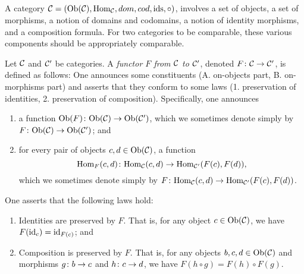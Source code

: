 \documentclass[CT4S-EN-RU]{subfiles}
\begin{document}
\begin{remarkRUS}
\end{remarkRUS}


\subsection{}

\begin{blockENG}
A category $\mathcal{C}=(\textnormal{Ob}(\mathcal{C}),\textnormal{Hom}_\mathcal{C},dom,cod,\textnormal{ids},\circ)$, involves a set of objects, a set of morphisms, a notion of domains and codomains, a notion of identity morphisms, and a composition formula. For two categories to be comparable, these various components should be appropriately comparable.
\end{blockENG}

\begin{blockRUS}
\end{blockRUS}

\begin{definitionENG}\label{def:functor}
Let $\mathcal{C}$ and $\mathcal{C}'$ be categories. A {\em functor $F$ from $\mathcal{C}$ to $\mathcal{C}'$}, denoted $F\colon\mathcal{C}\rightarrow\mathcal{C}'$, is defined as follows: One announces some constituents (A. on-objects part, B. on-morphisms part) and asserts that they conform to some laws (1. preservation of identities, 2. preservation of composition). Specifically, one announces
\begin{enumerate}[\hsp A.]
\item a function $\textnormal{Ob}(F)\colon\textnormal{Ob}(\mathcal{C})\rightarrow\textnormal{Ob}(\mathcal{C}')$, which we sometimes denote simply by $F\colon\textnormal{Ob}(\mathcal{C})\rightarrow\textnormal{Ob}(\mathcal{C}')$; and
\item for every pair of objects $c,d\in\textnormal{Ob}(\mathcal{C})$, a function $$\textnormal{Hom}_F(c,d)\colon\textnormal{Hom}_\mathcal{C}(c,d)\rightarrow\textnormal{Hom}_{\mathcal{C}'}(F(c),F(d)),$$ which we sometimes denote simply by $F\colon\textnormal{Hom}_\mathcal{C}(c,d)\rightarrow\textnormal{Hom}_{\mathcal{C}'}(F(c),F(d))$.
\end{enumerate}
One asserts that the following laws hold:
\begin{enumerate}[\hsp 1.]
\item Identities are preserved by $F$. That is, for any object $c\in\textnormal{Ob}(\mathcal{C})$, we have $F(\textnormal{id}_c)=\textnormal{id}_{F(c)}$; and
\item Composition is preserved by $F$. That is, for any objects $b,c,d\in\textnormal{Ob}(\mathcal{C})$ and morphisms $g\colon b\rightarrow c$ and $h\colon c\rightarrow d$, we have $F(h\circ g)=F(h)\circ F(g)$.
\end{enumerate}
\end{definitionENG}
\end{document}
